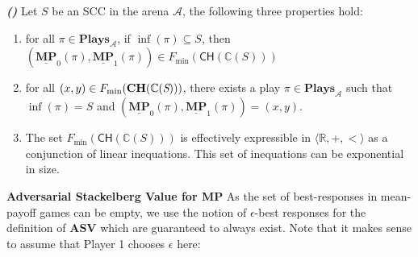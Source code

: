 \begin{lemma}
\label{lemCHToPlay}
\textbf{\emph{(\cite{FGR20})}} Let $S$ be an SCC in the arena $\mathcal{A}$, the following three properties hold:
\begin{enumerate}
    \item for all $\pi \in \mathbf{Plays}_{\mathcal{A}}$, if $\inf(\pi) \subseteq S$, then $(\underline{\mathbf{MP}}_0(\pi), \underline{\mathbf{MP}}_1(\pi)) \in F_{\min}(\mathsf{CH}(\mathbb{C}(S)))$
    \item for all $(x,y) \in F_{\min}(\mathbf{CH}(\mathbb{C}(\emph{S})))$, there exists a play $\pi \in \mathbf{Plays}_{\mathcal{A}}$ such that $\inf(\pi) = S$ and $(\underline{\mathbf{MP}}_0(\pi), \underline{\mathbf{MP}}_1(\pi)) = (x,y)$.
    \item The set $F_{\min}(\mathsf{CH}(\mathbb{C}(S)))$ is effectively expressible in $\langle \mathbb{R}, +, < \rangle$ as a conjunction of linear inequations. This set of inequations can be exponential in size.
\end{enumerate}
\end{lemma}


\noindent\textbf{Adversarial Stackelberg Value for MP} As the set of best-responses in mean-payoff games can be empty, we use the notion of $\epsilon$-best responses for the definition of $\mathbf{ASV}$ which are guaranteed to always exist. Note that it makes sense to assume that Player 1 chooses $\epsilon$ here:
\\



